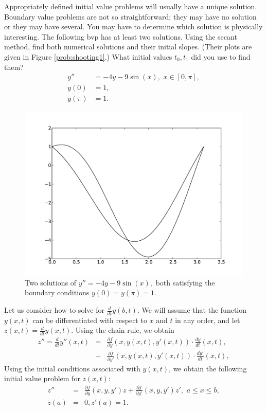 \begin{problem} Appropriately defined initial value problems will usually have a unique solution.
Boundary value problems are not so straightforward; they may have no solution or they may have several.
You may have to determine which solution is physically interesting.
The following bvp has at least two solutions.
Using the secant method, find both numerical solutions and their initial slopes.
(Their plots are given in Figure \eqref{prob:shooting1}.)
What initial values $t_0, t_1$ did you use to find them?
\begin{equation*}
\begin{split}
y'' &= -4y -9\sin(x), \,\, x \in [0,\pi],\\
y(0) &= 1, \\
y(\pi) &=1.
\end{split}
\end{equation*}
\end{problem}

\begin{figure}[ht]
\centering
\includegraphics[width=\textwidth]{Fig1.pdf}
\caption{Two solutions of $y'' = -4y -9\sin(x),$ both satisfying the boundary conditions $y(0) = y(\pi) = 1.$}
\label{prob:shooting1}
\end{figure}

Let us consider how to solve for $\frac{d}{dt} y(b,t)$.
We will assume that the function $y(x,t)$ can be differentiated with respect to $x$ and $t$ in any order, and let  $z(x,t) = \frac{d}{dt} y(x,t).$
Using the chain rule, we obtain 
\begin{eqnarray*}
z'' = \frac{d}{dt} y''(x,t) &=& \frac{\partial f}{\partial y} (x,y(x,t),y'(x,t)) \cdot \frac{dy}{dt}(x,t) ,\\
&+& \frac{\partial f}{\partial y'} (x,y(x,t),y'(x,t)) \cdot \frac{dy'}{dt}(x,t),
\end{eqnarray*}
Using the initial conditions associated with $y(x,t)$, we obtain the following initial value problem for $z(x,t)$: 
\begin{eqnarray*}
z'' &=& \frac{\partial f}{\partial y} (x,y,y') z + \frac{\partial f}{\partial y'} (x,y,y') z'
,\,\,a \leq x \leq b, \\
 z(a) &=& 0, z'(a) = 1.
\end{eqnarray*}

